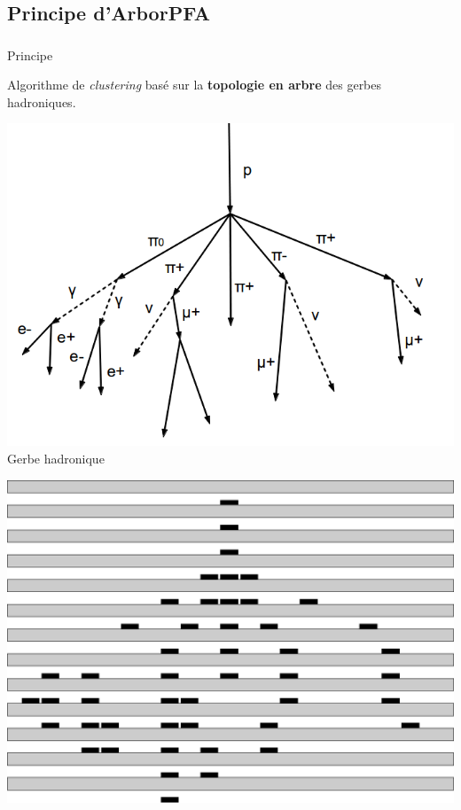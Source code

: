 \documentclass[8pt]{beamer}
\begin{document}
  \subsection{Principe d'ArborPFA}
  \begin{frame}
  \frametitle{\secname}
  \framesubtitle{\subsecname}
  \begin{block}{Principe}
    \begin{center}Algorithme de \textit{clustering} basé sur la \textbf{topologie en arbre} des gerbes hadroniques.\end{center}
  \end{block}
  \pause
  \begin{minipage}{0.325\linewidth}
    \begin{center}
      \includegraphics[width=0.9\linewidth]{ProtonDecay.png} \\
      Gerbe hadronique
    \end{center}
  \end{minipage} \hfill
  \begin{minipage}{0.325\linewidth}
    \begin{center}
      \pause
      \includegraphics[width=0.9\linewidth]{ProtonDecayCaloNoConnector.pdf} \\

\end{center}
\end{minipage}
\end{frame}
\end{document}
